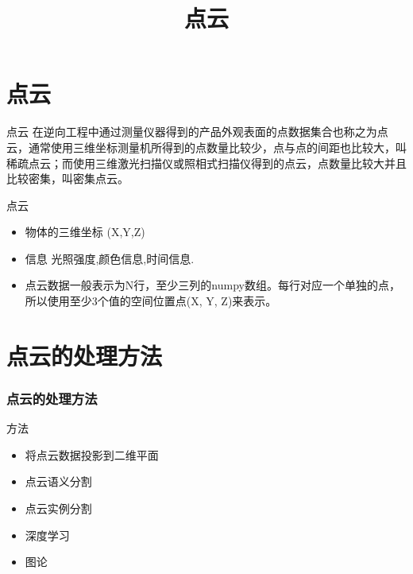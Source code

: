 \documentclass{beamer}
\title{点云}
\author{}
\begin{document}
\begin{frame}
\titlepage
\end{frame}


\begin{frame}
\tableofcontents
\end{frame}


\section{点云}




\begin{frame}
  \begin{block}{点云}
在逆向工程中通过测量仪器得到的产品外观表面的点数据集合也称之为点云，通常使用三维坐标测量机所得到的点数量比较少，点与点的间距也比较大，叫稀疏点云；而使用三维激光扫描仪或照相式扫描仪得到的点云，点数量比较大并且比较密集，叫密集点云。
  \end{block}
\end{frame}


\begin{frame}
  \begin{block}{点云}
  \begin{itemize}
  \item 物体的三维坐标 (X,Y,Z)
  \item 信息 光照强度,颜色信息,时间信息.
  \item 点云数据一般表示为N行，至少三列的numpy数组。每行对应一个单独的点，所以使用至少3个值的空间位置点(X, Y, Z)来表示。
  \end{itemize}
  \end{block}

\end{frame}

\section{点云的处理方法}

\begin{frame}
  \frametitle{点云的处理方法}
  \begin{block}{方法}
  \begin{itemize}
  \item 将点云数据投影到二维平面
  \item 点云语义分割
  \item 点云实例分割
  \item 深度学习
  \item 图论
  \end{itemize}
  \end{block}

\end{frame}
\end{document}
